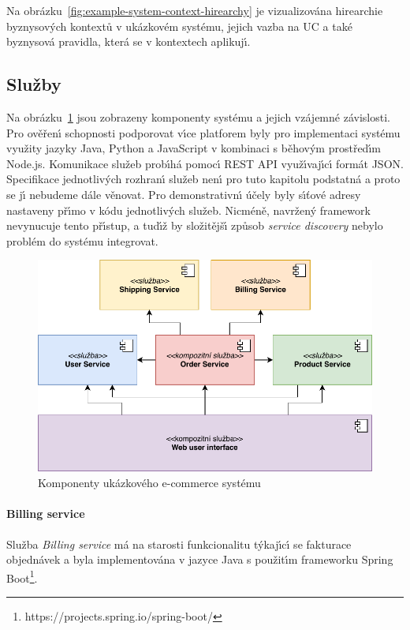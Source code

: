 Na obrázku~\ref{fig:example-system-context-hirearchy} je vizualizována
hirearchie byznysov\'ych kontextů v ukázkovém systému, jejich vazba na \gls{UC}
a také byznysová pravidla, která se v kontextech aplikuj\'{\i}.

\subsection{Služby}

Na obrázku~\ref{fig:example-system} jsou zobrazeny komponenty systému a jejich vzájemné závislosti.
Pro ověřen\'{\i} schopnosti podporovat v\'{\i}ce platforem byly pro implementaci systému využity
jazyky Java, Python a JavaScript v kombinaci s běhov\'ym prostřed\'{\i}m Node.js.
Komunikace služeb prob\'{\i}há pomoc\'{\i} \gls{REST} \gls{API} využ\'{\i}vaj\'{\i}c\'{\i} formát \gls{JSON}.
Specifikace jednotliv\'ych rozhran\'{\i} služeb nen\'{\i} pro tuto kapitolu podstatná a proto se
j\'{\i} nebudeme dále věnovat. Pro demonstrativn\'{\i} účely byly s\'{\i}ťové adresy nastaveny př\'{\i}mo v kódu jednotliv\'ych
služeb. Nicméně, navržen\'y framework nevynucuje tento př\'{\i}stup, a tud\'{\i}ž by složitějš\'{\i}
způsob \textit{service discovery} nebylo problém do systému integrovat.

\begin{figure}
    \centering
    \includegraphics[keepaspectratio=true, width=0.8\linewidth]{figures/example-system.pdf}
    \caption{Komponenty ukázkového e-commerce systému}
    \label{fig:example-system}
\end{figure}

\paragraph{Billing service}

Služba \textit{Billing service} má na starosti funkcionalitu t\'ykaj\'{\i}c\'{\i} se fakturace objednávek
a byla implementována v jazyce Java s použit\'{\i}m frameworku Spring Boot\footnote{https://projects.spring.io/spring-boot/}.

